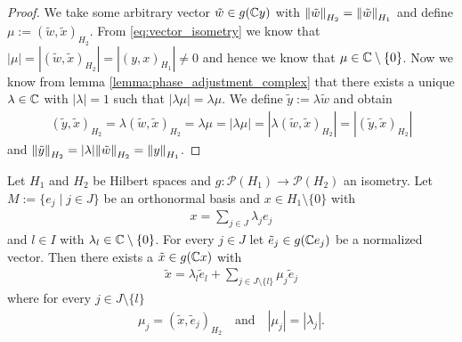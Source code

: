 \begin{proof}
	We take some arbitrary vector $\tilde{w} \in g(\C y)$ with $\norm[H_2]{\tilde{w}} = \norm[H_1]{\tilde{w}}$ and define $\mu := (\tilde{w}, \tilde{x})_{H_2}$. From \eqref{eq:vector_isometry} we know that $|\mu| = |(\tilde{w},\tilde{x})_{H_2}| = |(y,x)_{H_1}| \neq 0$ and hence we know that $\mu \in \C \setminus \{0\}$. Now we know from lemma \ref{lemma:phase_adjustment_complex} that there exists a unique $\lambda \in \C$ with $|\lambda| = 1$ such that $|\lambda \mu| = \lambda \mu$. We define $\tilde{y} := \lambda \tilde{w}$ and obtain
	\begin{align*}
		(\tilde{y}, \tilde{x})_{H_2} = \lambda (\tilde{w}, \tilde{x})_{H_2} = \lambda \mu = |\lambda \mu| = |\lambda (\tilde{w}, \tilde{x})_{H_2}| = |(\tilde{y},\tilde{x})_{H_2}|
	\end{align*}
	and $\norm[H_2]{\tilde{y}} = |\lambda| \norm[H_2]{\tilde{w}} = \norm[H_1]{y}$. 
\end{proof}


\begin{lemma} \label{lemma:aux_main}
	Let $H_1$ and $H_2$ be Hilbert spaces and $g: \mathcal{P}(H_1) \to \mathcal{P}(H_2)$ an isometry. Let $M := \{e_j \mid j \in J\}$ be an orthonormal basis and $x \in H_1 \setminus \{0\}$ with
	\begin{align*}
		x = \sum_{j \in J} \lambda_j e_j
	\end{align*} 
	and $l \in I$ with $\lambda_l \in \C \setminus \{0\}$. For every $j \in J$ let $\tilde{e}_j \in g(\C e_j)$ be a normalized vector. Then there exists a $\tilde{x} \in g(\C x)$ with 
	\begin{align*}
		\tilde{x} = \lambda_l \tilde{e}_l + \sum_{j \in J \setminus \{l\}} \mu_j \tilde{e}_j
	\end{align*}
	where for every $j \in J \setminus \{l\}$
	\begin{align*}
		\mu_j = (\tilde{x}, \tilde{e}_j)_{H_2} \quad \text{and} \quad |\mu_j| = |\lambda_j|.
	\end{align*}
\end{lemma}

